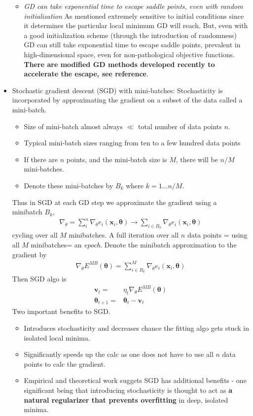 \documentclass[norsk,a4paper,11pt]{article}
\begin{document}
\begin{itemize}
\begin{itemize}
			\item \textit{GD can take exponential time to escape saddle points, even with random initialization}
			As mentioned extremely sensitive to initial conditions since it determines the particular local minimum GD will reach. But, even with a good initialization scheme (through the introduction of randomness) GD can still take exponential time to escape saddle points, prevalent in high-dimensional space, even for non-pathological objective functions. \textbf{There are modified GD methods developed recently to accelerate the escape, see reference}.
		\end{itemize}

		\item Stochastic gradient descent (SGD) with mini-batches:
		Stochasticity is incorporated by approximating the gradient on a subset of the data called a mini-batch. 
		\begin{itemize}
			\item Size of mini-batch almost always $\ll$ total number of data points $n$.
			\item Typical mini-batch sizes ranging from ten to a few hundred data points
			\item If there are $n$ points, and the mini-batch size is $M$, there will be $n/M$ mini-batches.
			\item Denote these mini-batches by $B_k$ where $k=1...n/M$.
		\end{itemize}
		Thus in SGD at each GD step we approximate the gradient using a minibatch $B_k$,
		\begin{align}
			\nabla_\theta = \sum_i^n \nabla_\theta e_i (\mathbf{x}_i, \bm{\theta}) \rightarrow \sum_{i\in B_k} \nabla_\theta e_i (\mathbf{x}_i, \bm{\theta})
		\end{align} 
		cycling over all $M$ minibatches. A full iteration over all $n$ data points = using all $M$ minibatches= an \textit{epoch}. Denote the minibatch approximation to the gradient by
		\begin{align}
			\nabla_\theta E^{MB} (\bm{\theta}) = \sum_{i\in B_k}^M \nabla_\theta e_i (\mathbf{x}_i, \bm{\theta})
		\end{align}
		Then SGD algo is
		\begin{align}
			\mathbf{v}_t =& \eta_t \nabla_\theta E^{MB} (\bm{\theta}) \\
			\bm{\theta}_{t+1} =& \bm{\theta}_t - \mathbf{v}_t
		\end{align}
		Two important benefits to SGD.
		\begin{itemize}
			\item Introduces stochasticity and decreases chance the fitting algo gets stuck in isolated local minima.
			\item Significantly speeds up the calc as one does not have to use all $n$ data points to calc the gradient. 
			\item Empirical and theoretical work suggets SGD has additional benefits - one significant being that introducing stochasticity is thought to act as \textbf{a natural regularizer that prevents overfitting} in deep, isolated minima.
		\end{itemize}


\end{itemize}
\end{document}
